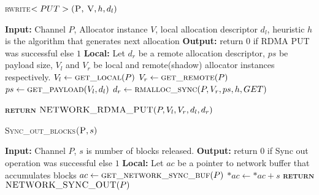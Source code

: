 \documentclass[10pt]{article}
\begin{document}
\begin{algorithm}{}
\footnotesize
\caption{\textsc{rwrite}{$<PUT>\textsc{(P, V}, h, d_l)$}}
\label{alg:rread_PUT} 
\begin{algorithmic}[1]


\STATE \textbf{Input:} Channel $P$, Allocator instance $V$, local allocation descriptor $d_l$,  heuristic $h$ is the algorithm that generates next allocation
\STATE \textbf{Output:} return {$0$} if RDMA PUT was successful else {$1$}
\STATE \textbf{Local:} Let $d_r$ be a remote allocation descriptor,  $ps$ be payload size, $V_l$ and $V_r$ be local and remote(shadow) allocator instances respectively.
\STATE \quad $\textbf{$V_l$} \leftarrow  \textsc{get\_local}(P)$ 
\STATE \quad $\textbf{$V_r$} \leftarrow  \textsc{get\_remote}(P)$ 
\STATE \quad $\textbf{$ps$} \leftarrow  \textsc{get\_payload}(V_l, d_l)$ 
\STATE \quad $\textbf{$d_r$} \leftarrow  \textsc{rmalloc\_sync}(P, V_r, ps, h, GET)$ 

\STATE \textsc{\textbf{return}} {$\textsc{NETWORK\_RDMA\_PUT}(P, V_l, V_r, d_l, d_r)$}
\STATE


\end{algorithmic}
\end{algorithm}



\begin{algorithm}{}
\footnotesize
\caption{\textsc{Sync\_out\_blocks}{$\textsc{(P}, s)$}}
\label{alg:Sync_out_blocks} 
\begin{algorithmic}[1]

\STATE \textbf{Input:} Channel $P$, $s$ is number of blocks released.
\STATE \textbf{Output:} return {$0$} if Sync out operation was successful else {$1$}
\STATE \textbf{Local:} Let $ac$ be a pointer to network buffer that accumulates blocks
\STATE \quad $\textbf{$ac$} \leftarrow  \textsc{get\_network\_sync\_buf}(P)$ 
\STATE \quad $\textbf{$*ac$} \leftarrow  \textbf{$*ac$} + s$ 
\STATE \textsc{\textbf{return}} {$\textsc{NETWORK\_SYNC\_OUT}(P)$}
\STATE


\end{algorithmic}
\end{algorithm}
\end{document}

